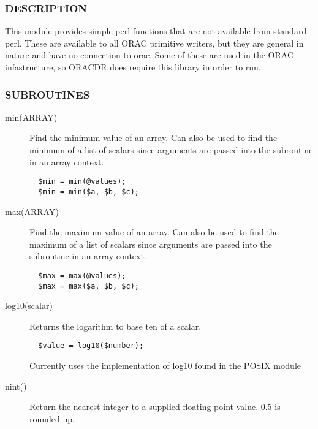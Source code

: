 \subsubsection*{DESCRIPTION\label{ORAC::General_DESCRIPTION}}

This module provides simple perl functions that are not available
from standard perl. These are available to all ORAC primitive writers,
but they are general in nature and have no connection to orac. Some of
these are used in the ORAC infastructure, so ORACDR does require this
library in order to run.

\subsubsection*{SUBROUTINES\label{ORAC::General_SUBROUTINES}}\begin{description}
\item[min(ARRAY)] \mbox{}

Find the minimum value of an array. Can also be used to find
the minimum of a list of scalars since arguments are passed into
the subroutine in an array context.

\begin{verbatim}
  $min = min(@values);
  $min = min($a, $b, $c);
\end{verbatim}
\item[max(ARRAY)] \mbox{}

Find the maximum value of an array. Can also be used to find
the maximum of a list of scalars since arguments are passed into
the subroutine in an array context.

\begin{verbatim}
  $max = max(@values);
  $max = max($a, $b, $c);
\end{verbatim}
\item[log10(scalar)] \mbox{}

Returns the logarithm to base ten of a scalar.

\begin{verbatim}
  $value = log10($number);
\end{verbatim}


Currently uses the implementation of log10 found in the
POSIX module

\item[nint()] \mbox{}

Return the nearest integer to a supplied floating point
value. 0.5 is rounded up.


\end{description}
